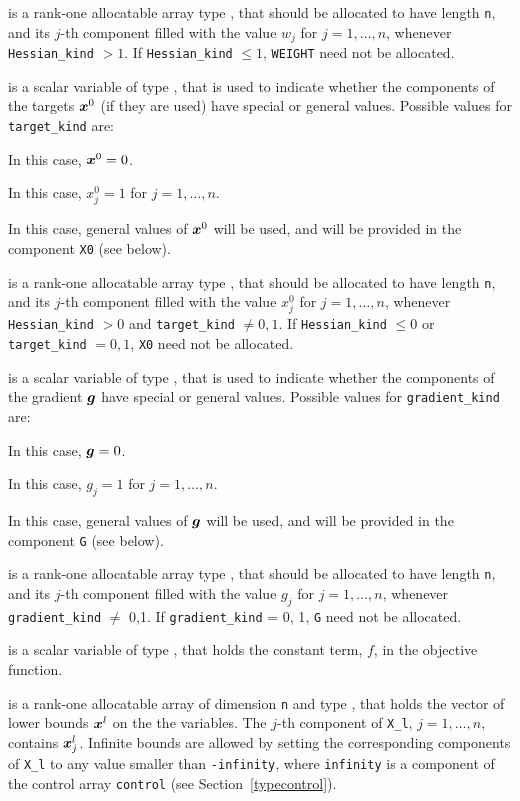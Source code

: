\documentclass{galahad}
\begin{document}
\begin{description}
 is a rank-one allocatable array type \realdp, that
should be allocated to have length {\tt n}, and its $j$-th component
filled with the value $w_{j}$ for $j = 1, \ldots , n$,
whenever {\tt Hessian\_kind} $>1$.
If {\tt Hessian\_kind} $\leq 1$, {\tt WEIGHT} need not be allocated.

 is a scalar variable of type \integer,
that is used to indicate whether the components of the targets ${\bm{x}}^0$
(if they are used) have special or general values. Possible values for
{\tt target\_kind} are:
\begin{description}
  In this case, ${\bm{x}}^0 = 0$.

 In this case, $x^0_{j} = 1$ for $j = 1, \ldots , n$.

 In this case, general values of ${\bm{x}}^0$ will be used,
     and will be provided in the component {\tt X0} (see below).
\end{description}

 is a rank-one allocatable array type \realdp, that
should be allocated to have length {\tt n}, and its $j$-th component
filled with the value $x_{j}^0$ for $j = 1, \ldots , n$,
whenever {\tt Hessian\_kind} $>0$ and {\tt target\_kind} $\neq 0,1$.
If {\tt Hessian\_kind} $\leq 0$ or {\tt target\_kind} $= 0,1$,
{\tt X0} need not be allocated.

 is a scalar variable of type \integer,
that is used to indicate whether the components of the gradient ${\bm{g}}$
have special or general values. Possible values for {\tt gradient\_kind} are:
\begin{description}
  In this case, ${\bm{g}} = 0$.

 In this case, $g_{j} = 1$ for $j = 1, \ldots , n$.

 In this case, general values of ${\bm{g}}$ will be used,
     and will be provided in the component {\tt G} (see below).
\end{description}

 is a rank-one allocatable array type \realdp, that
should be allocated to have length {\tt n}, and its $j$-th component
filled with the value $g_{j}$ for $j = 1, \ldots , n$,
whenever {\tt gradient\_kind} $\neq$ 0,1.
If {\tt gradient\_kind} {= 0, 1}, {\tt G} need not be allocated.

 is a scalar variable of type
\realdp, that holds
the constant term, $f$, in the objective function.

 is a rank-one allocatable array of dimension {\tt n} and type
\realdp, that holds
the vector of lower bounds ${\bm{x}}^{l}$ on the the variables.
The $j$-th component of {\tt X\_l}, $j = 1, \ldots , n$,
contains ${\bm{x}}_{j}^{l}$.
Infinite bounds are allowed by setting the corresponding
components of {\tt X\_l} to any value smaller than {\tt -infinity},
where {\tt infinity} is a component of the control array {\tt control}
(see Section~\ref{typecontrol}).


\end{description}
\end{document}

